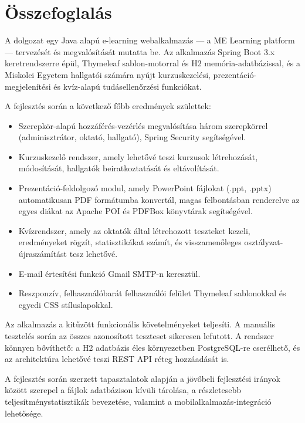 \chapter{Összefoglalás}

A dolgozat egy Java alapú e-learning webalkalmazás — a ME Learning platform — tervezését és megvalósítását mutatta be. Az alkalmazás Spring Boot 3.x keretrendszerre épül, Thymeleaf sablon-motorral és H2 memória-adatbázissal, és a Miskolci Egyetem hallgatói számára nyújt kurzuskezelési, prezentáció-megjelenítési és kvíz-alapú tudásellenőrzési funkciókat.

A fejlesztés során a következő főbb eredmények születtek:

\begin{itemize}
    \item Szerepkör-alapú hozzáférés-vezérlés megvalósítása három szerepkörrel (adminisztrátor, oktató, hallgató), Spring Security segítségével.
    \item Kurzuskezelő rendszer, amely lehetővé teszi kurzusok létrehozását, módosítását, hallgatók beiratkoztatását és eltávolítását.
    \item Prezentáció-feldolgozó modul, amely PowerPoint fájlokat (.ppt, .pptx) automatikusan PDF formátumba konvertál, magas felbontásban renderelve az egyes diákat az Apache POI és PDFBox könyvtárak segítségével.
    \item Kvízrendszer, amely az oktatók által létrehozott teszteket kezeli, eredményeket rögzít, statisztikákat számít, és visszamenőleges osztályzat-újraszámítást tesz lehetővé.
    \item E-mail értesítési funkció Gmail SMTP-n keresztül.
    \item Reszponzív, felhasználóbarát felhasználói felület Thymeleaf sablonokkal és egyedi CSS stíluslapokkal.
\end{itemize}

Az alkalmazás a kitűzött funkcionális követelményeket teljesíti. A manuális tesztelés során az összes azonosított teszteset sikeresen lefutott. A rendszer könnyen bővíthető: a H2 adatbázis éles környezetben PostgreSQL-re cserélhető, és az architektúra lehetővé teszi REST API réteg hozzáadását is.

A fejlesztés során szerzett tapasztalatok alapján a jövőbeli fejlesztési irányok között szerepel a fájlok adatbázison kívüli tárolása, a részletesebb teljesítménystatisztikák bevezetése, valamint a mobilalkalmazás-integráció lehetősége.
